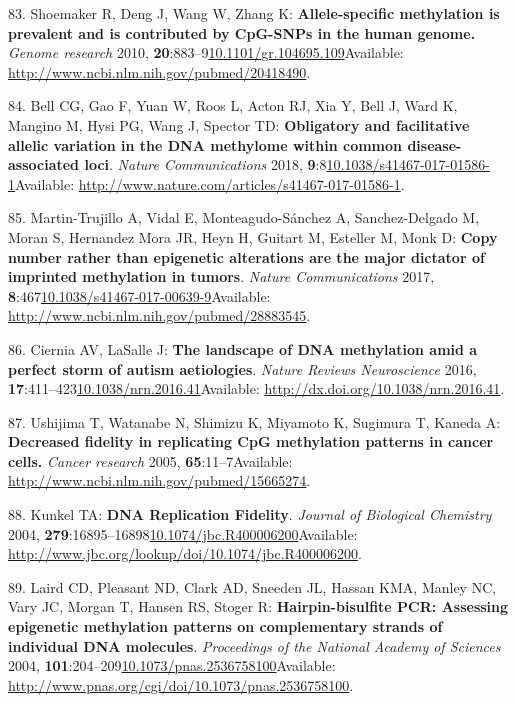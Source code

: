 \documentclass[
]{book}
\begin{document}
\leavevmode\hypertarget{ref-Shoemaker2010}{}%
83. Shoemaker R, Deng J, Wang W, Zhang K: \textbf{Allele-specific methylation is prevalent and is contributed by CpG-SNPs in the human genome.} \emph{Genome research} 2010, \textbf{20}:883--9\href{https://doi.org/10.1101/gr.104695.109}{10.1101/gr.104695.109}Available: \url{http://www.ncbi.nlm.nih.gov/pubmed/20418490}.

\leavevmode\hypertarget{ref-Bell2017a}{}%
84. Bell CG, Gao F, Yuan W, Roos L, Acton RJ, Xia Y, Bell J, Ward K, Mangino M, Hysi PG, Wang J, Spector TD: \textbf{Obligatory and facilitative allelic variation in the DNA methylome within common disease-associated loci}. \emph{Nature Communications} 2018, \textbf{9}:8\href{https://doi.org/10.1038/s41467-017-01586-1}{10.1038/s41467-017-01586-1}Available: \url{http://www.nature.com/articles/s41467-017-01586-1}.

\leavevmode\hypertarget{ref-Martin-Trujillo2017}{}%
85. Martin-Trujillo A, Vidal E, Monteagudo-Sánchez A, Sanchez-Delgado M, Moran S, Hernandez Mora JR, Heyn H, Guitart M, Esteller M, Monk D: \textbf{Copy number rather than epigenetic alterations are the major dictator of imprinted methylation in tumors}. \emph{Nature Communications} 2017, \textbf{8}:467\href{https://doi.org/10.1038/s41467-017-00639-9}{10.1038/s41467-017-00639-9}Available: \url{http://www.ncbi.nlm.nih.gov/pubmed/28883545}.

\leavevmode\hypertarget{ref-Ciernia2016}{}%
86. Ciernia AV, LaSalle J: \textbf{The landscape of DNA methylation amid a perfect storm of autism aetiologies}. \emph{Nature Reviews Neuroscience} 2016, \textbf{17}:411--423\href{https://doi.org/10.1038/nrn.2016.41}{10.1038/nrn.2016.41}Available: \url{http://dx.doi.org/10.1038/nrn.2016.41}.

\leavevmode\hypertarget{ref-Ushijima2005}{}%
87. Ushijima T, Watanabe N, Shimizu K, Miyamoto K, Sugimura T, Kaneda A: \textbf{Decreased fidelity in replicating CpG methylation patterns in cancer cells.} \emph{Cancer research} 2005, \textbf{65}:11--7Available: \url{http://www.ncbi.nlm.nih.gov/pubmed/15665274}.

\leavevmode\hypertarget{ref-Kunkel2004a}{}%
88. Kunkel TA: \textbf{DNA Replication Fidelity}. \emph{Journal of Biological Chemistry} 2004, \textbf{279}:16895--16898\href{https://doi.org/10.1074/jbc.R400006200}{10.1074/jbc.R400006200}Available: \url{http://www.jbc.org/lookup/doi/10.1074/jbc.R400006200}.

\leavevmode\hypertarget{ref-Laird2004}{}%
89. Laird CD, Pleasant ND, Clark AD, Sneeden JL, Hassan KMA, Manley NC, Vary JC, Morgan T, Hansen RS, Stoger R: \textbf{Hairpin-bisulfite PCR: Assessing epigenetic methylation patterns on complementary strands of individual DNA molecules}. \emph{Proceedings of the National Academy of Sciences} 2004, \textbf{101}:204--209\href{https://doi.org/10.1073/pnas.2536758100}{10.1073/pnas.2536758100}Available: \url{http://www.pnas.org/cgi/doi/10.1073/pnas.2536758100}.
\end{document}
